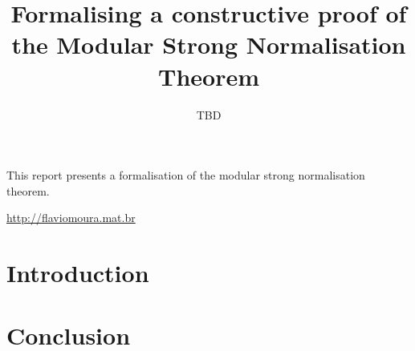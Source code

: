 \documentclass[12pt]{llncs}
\title{Formalising a constructive proof of the Modular Strong Normalisation Theorem}
\author{TBD}
\begin{document}
\maketitle

This report presents a formalisation of the modular strong normalisation theorem.

\begin{center} \url{http://flaviomoura.mat.br} \end{center}

\thispagestyle{empty}
\mbox{}\vfill


\section{Introduction}



\section{Conclusion}

\clearpage



\end{document}
